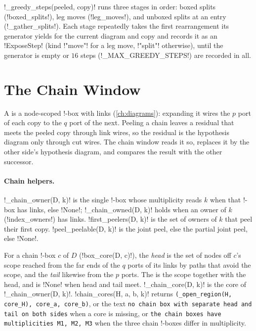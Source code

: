 \py!_greedy_steps(peeled, copy)! runs three stages in order: boxed splits (\py!boxed_splits!), leg moves (\py!leg_moves!), and unboxed splits at an entry (\py!_gather_splits!). Each stage repeatedly takes the first rearrangement its generator yields for the current diagram and copy and records it as an \py!ExposeStep! (kind \code!"move"! for a leg move, \code!"split"! otherwise), until the generator is empty or $16$ steps (\py!_MAX_GREEDY_STEPS!) are recorded in all.

\section{The Chain Window}\label{sec:kernel-chain}

A  is a node-scoped !-box with links (\cref{ch:diagrams}): expanding it wires the $p$ port of each copy to the $q$ port of the next. Peeling a chain leaves a residual that meets the peeled copy through link wires, so the residual is the hypothesis diagram only through cut wires. The chain window reads it so, replaces it by the other side's hypothesis diagram, and compares the result with the other successor.

\paragraph{Chain helpers.} \py!_chain_owner(D, k)! is the single !-box whose multiplicity reads $k$ when that !-box has links, else \py!None!; \py!_chain_owned(D, k)! holds when an owner of $k$ (\py!index_owners!) has links. \py!first_peelers(D, k)! is the set of owners of $k$ that peel their first copy. \py!peel_peelable(D, k)! is the joint peel, else the partial joint peel, else \py!None!.

\begin{definition}\label{def:kernel-chain-core}
For a chain !-box $c$ of $D$ (\py!box_core(D, c)!), the \emph{head} is the set of nodes off $c$'s scope reached from the far ends of the $q$ ports of its links by paths that avoid the scope, and the \emph{tail} likewise from the $p$ ports. The  is the scope together with the head, and is \py!None! when head and tail meet. \py!_chain_core(D, k)! is the core of \py!_chain_owner(D, k)!. \py!chain_cores(H, a, b, k)! returns \texttt{(\allowbreak{}\_\allowbreak{}open\_\allowbreak{}region(\allowbreak{}H,\allowbreak{} core\_\allowbreak{}H),\allowbreak{} core\_\allowbreak{}a,\allowbreak{} core\_\allowbreak{}b)}, or the text \texttt{no chain box with separate head and tail on both sides} when a core is missing, or \texttt{the chain boxes have multiplicities M1,\allowbreak{} M2,\allowbreak{} M3} when the three chain !-boxes differ in multiplicity.
\end{definition}

